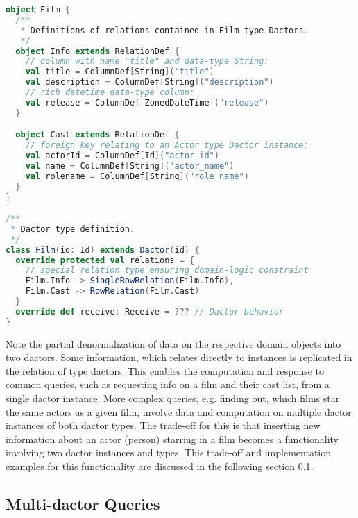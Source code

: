 \begin{lstlisting}[caption=Film Dactor type definition using the actordb framework, label=lst:film_definition, language=Scala]
object Film {
  /**
   * Definitions of relations contained in Film type Dactors.
   */
  object Info extends RelationDef {
    // column with name "title" and data-type String:
    val title = ColumnDef[String]("title")
    val description = ColumnDef[String]("description")
    // rich datetime data-type column:
    val release = ColumnDef[ZonedDateTime]("release")
  }

  object Cast extends RelationDef {
    // foreign key relating to an Actor type Dactor instance:
    val actorId = ColumnDef[Id]("actor_id")
    val name = ColumnDef[String]("actor_name")
    val rolename = ColumnDef[String]("role_name")
  }
} 

/**
 * Dactor type definition.
 */
class Film(id: Id) extends Dactor(id) {
  override protected val relations = {
    // special relation type ensuring domain-logic constraint
    Film.Info -> SingleRowRelation(Film.Info),
    Film.Cast -> RowRelation(Film.Cast)
  }
  override def receive: Receive = ??? // Dactor behavior
}
\end{lstlisting}

%

Note the partial denormalization of data on the respective domain objects into two \glspl{dactor}.
Some information, which relates directly to  instances is replicated in the  relation of  type \glspl{dactor}.
This enables the computation and response to common queries, such as requesting info on a film and their cast list, from a single \gls{dactor} instance.
More complex queries, e.g. finding out, which films star the same actors as a given film, involve data and computation on multiple \gls{dactor} instances of both \gls{dactor} types.
The trade-off for this is that inserting new information about an actor (person) starring in a film becomes a functionality involving two \gls{dactor} instances and types.
This trade-off and implementation examples for this functionality are discussed in the following section \ref{subsec:multi_dactor_queries}.


\subsection[Multi-Dactor Queries]{Multi-\Gls{dactor} Queries}\label{subsec:multi_dactor_queries}

